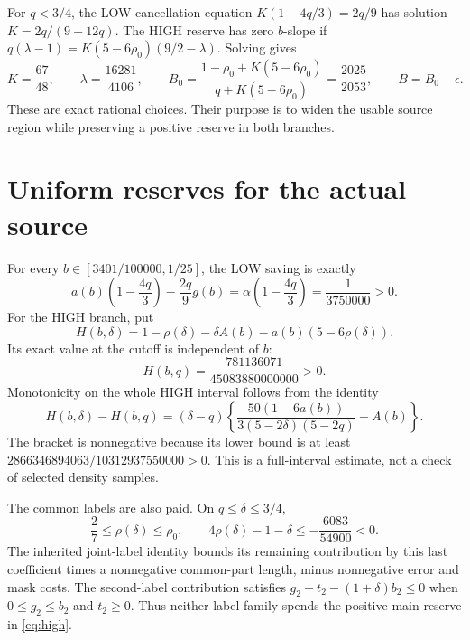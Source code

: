 \documentclass[10pt]{article}
\begin{document}
For $q<3/4$, the LOW cancellation equation $K(1-4q/3)=2q/9$ has solution
$K=2q/(9-12q)$. The HIGH reserve has zero $b$-slope if
$q(\lambda-1)=K(5-6\rho_0)(9/2-\lambda)$.
Solving gives
\[
 K=\frac{67}{48},\qquad \lambda=\frac{16281}{4106},\qquad
 B_0=\frac{1-\rho_0+K(5-6\rho_0)}{q+K(5-6\rho_0)}
     =\frac{2025}{2053},\qquad B=B_0-\epsilon.
\]
These are exact rational choices. Their purpose is to widen the usable source
region while preserving a positive reserve in both branches.

\newpage
\section{Uniform reserves for the actual source}
For every $b\in[3401/100000,1/25]$, the LOW saving is exactly
\begin{equation}\label{eq:low}
 a(b)\left(1-\frac{4q}{3}\right)-\frac{2q}{9}g(b)
 =\alpha\left(1-\frac{4q}{3}\right)=\frac1{3750000}>0.
\end{equation}
For the HIGH branch, put
\[
 H(b,\delta)=1-\rho(\delta)-\delta A(b)
               -a(b)(5-6\rho(\delta)).
\]
Its exact value at the cutoff is independent of $b$:
\begin{equation}\label{eq:high}
 H(b,q)=\frac{781136071}{45083880000000}>0.
\end{equation}
Monotonicity on the whole HIGH interval follows from the identity
\[
 H(b,\delta)-H(b,q)
 =(\delta-q)\left\{
 \frac{50(1-6a(b))}{3(5-2\delta)(5-2q)}-A(b)\right\}.
\]
The bracket is nonnegative because its lower bound is at least
$2866346894063/10312937550000>0$. This is a full-interval estimate,
not a check of selected density samples.

The common labels are also paid. On $q\le\delta\le3/4$,
\[
 \frac27\le\rho(\delta)\le\rho_0,\qquad
 4\rho(\delta)-1-\delta\le-\frac{6083}{54900}<0.
\]
The inherited joint-label identity bounds its remaining contribution by this
last coefficient times a nonnegative common-part length, minus nonnegative
error and mask costs. The second-label contribution satisfies
$g_2-t_2-(1+\delta)b_2\le0$ when $0\le g_2\le b_2$ and $t_2\ge0$.
Thus neither label family spends the positive main reserve in
\eqref{eq:high}.
\end{document}
